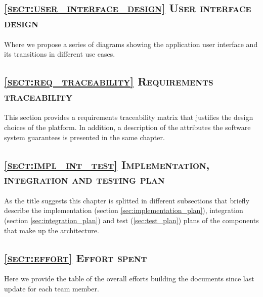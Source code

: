 \subsection*{\textsc{\textcolor{myblue}{\ref{sect:user_interface_design} User interface design}}}
Where we propose a series of diagrams showing the application user interface and its transitions in different use cases.

\subsection*{\textsc{\textcolor{myblue}{\ref{sect:req_traceability} Requirements traceability}}}
This section provides a requirements traceability matrix that justifies the design choices of the platform. In addition, a description of the attributes the software system guarantees is presented in the same chapter.

\subsection*{\textsc{\textcolor{myblue}{\ref{sect:impl_int_test} Implementation, integration and testing plan}}}
As the title suggests this chapter is splitted in different subsections that briefly describe the implementation (section \ref{sec:implementation_plan}), integration (section \ref{sec:integration_plan}) and test (\ref{sec:test_plan}) plans of the components that make up the architecture.


\subsection*{\textsc{\textcolor{myblue}{\ref{sect:effort} Effort spent}}}
Here we provide the table of the overall efforts building the documents since last update for each team member.

